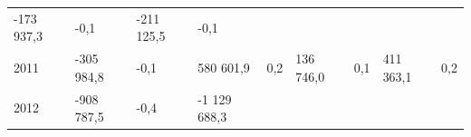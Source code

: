 \begin{longtable}[]{@{}lllllllll@{}}
\begin{minipage}[t]{0.12\columnwidth}
-173 937,3\strut
\end{minipage} & \begin{minipage}[t]{0.06\columnwidth}\raggedright
-0,1\strut
\end{minipage} & \begin{minipage}[t]{0.10\columnwidth}\raggedright
-211 125,5\strut
\end{minipage} & \begin{minipage}[t]{0.06\columnwidth}\raggedright
-0,1\strut
\end{minipage}\tabularnewline
\begin{minipage}[t]{0.05\columnwidth}\raggedright
2011\strut
\end{minipage} & \begin{minipage}[t]{0.10\columnwidth}\raggedright
-305 984,8\strut
\end{minipage} & \begin{minipage}[t]{0.06\columnwidth}\raggedright
-0,1\strut
\end{minipage} & \begin{minipage}[t]{0.16\columnwidth}\raggedright
580 601,9\strut
\end{minipage} & \begin{minipage}[t]{0.06\columnwidth}\raggedright
0,2\strut
\end{minipage} & \begin{minipage}[t]{0.12\columnwidth}\raggedright
136 746,0\strut
\end{minipage} & \begin{minipage}[t]{0.06\columnwidth}\raggedright
0,1\strut
\end{minipage} & \begin{minipage}[t]{0.10\columnwidth}\raggedright
411 363,1\strut
\end{minipage} & \begin{minipage}[t]{0.06\columnwidth}\raggedright
0,2\strut
\end{minipage}\tabularnewline
\begin{minipage}[t]{0.05\columnwidth}\raggedright
2012\strut
\end{minipage} & \begin{minipage}[t]{0.10\columnwidth}\raggedright
-908 787,5\strut
\end{minipage} & \begin{minipage}[t]{0.06\columnwidth}\raggedright
-0,4\strut
\end{minipage} & \begin{minipage}[t]{0.16\columnwidth}\raggedright
-1 129 688,3\strut

\end{minipage}
\end{longtable}
